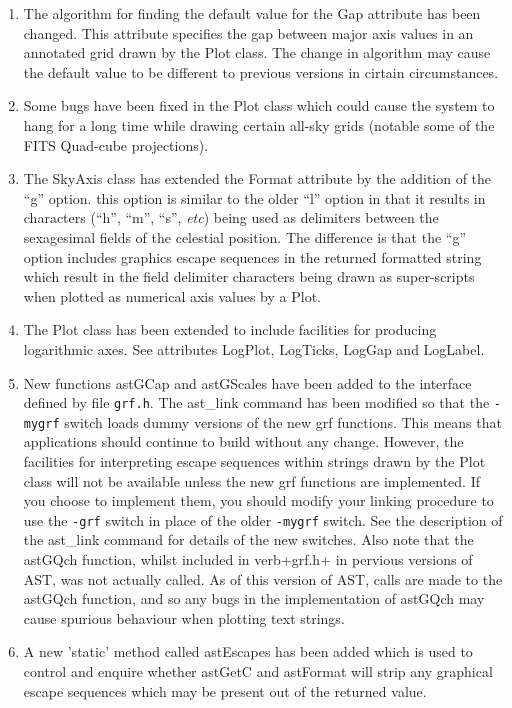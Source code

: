 \documentclass[twoside,11pt]{starlink}
\begin{document}
\begin{enumerate}
\item The algorithm for finding the default value for the Gap attribute
has been changed. This attribute specifies the gap between major axis
values in an annotated grid drawn by the Plot class. The change in
algorithm may cause the default value to be different to previous versions
in cirtain circumstances.

\item Some bugs have been fixed in the Plot class which could cause the
system to hang for a long time while drawing certain all-sky grids
(notable some of the FITS Quad-cube projections).

\item The SkyAxis class has extended the Format attribute by the addition
of the ``g'' option. this option is similar to the older ``l'' option in that
it results in characters (``h'', ``m'', ``s'', \emph{etc}) being used as
delimiters between the sexagesimal fields of the celestial position. The
difference is that the ``g'' option includes graphics escape sequences
in the returned formatted string which result in the field delimiter
characters being drawn as super-scripts when plotted as numerical axis values
by a Plot.

\item The Plot class has been extended to include facilities for producing
logarithmic axes. See attributes LogPlot, LogTicks, LogGap and LogLabel.

\item New functions astGCap and astGScales have been added to the interface
defined by file \verb+grf.h+. The ast\_link command has been modified so
that the \verb+-mygrf+ switch loads dummy versions of the new grf
functions. This means that applications should continue to build without
any change. However, the facilities for interpreting escape sequences
within strings drawn by the Plot class will not be available unless the
new grf functions are implemented. If you choose to implement them, you
should modify your linking procedure to use the \verb+-grf+ switch in
place of the older \verb+-mygrf+ switch. See the description of the ast\_link
command for details of the new switches. Also note that the astGQch
function, whilst included in verb+grf.h+ in pervious versions of AST, was
not actually called. As of this version of AST, calls are made to the
astGQch function, and so any bugs in the implementation of astGQch may
cause spurious behaviour when plotting text strings.

\item A new 'static' method called astEscapes has been added which is used
to control and enquire whether astGetC and astFormat will strip any graphical
escape sequences which may be present out of the returned value.


\end{enumerate}
\end{document}

